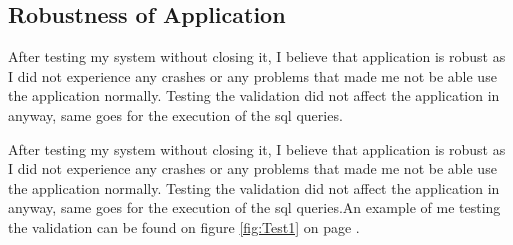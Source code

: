 \subsection{Robustness of Application}

After testing my system without closing it, I believe that application is robust as I did not experience any crashes or any problems that made me not be able use the application normally. Testing the validation did not affect the application in anyway, same goes for the execution of the sql queries.

After testing my system without closing it, I believe that application is robust as I did not experience any crashes or any problems that made me not be able use the application normally. Testing the validation did not affect the application in anyway, same goes for the execution of the sql queries.An example of me testing the validation can be found on figure \ref{fig:Test1} on page \pageref{fig:Test12}.

